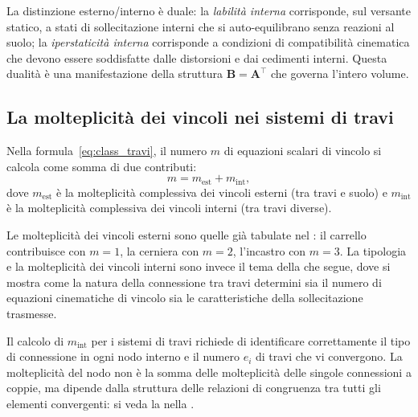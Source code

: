 \begin{oss}
	La distinzione esterno/interno è duale: la
	\emph{labilità interna} corrisponde, sul versante
	statico, a stati di sollecitazione interni che si
	auto-equilibrano senza reazioni al suolo; la
	\emph{iperstaticità interna} corrisponde a condizioni
	di compatibilità cinematica che devono essere soddisfatte
	dalle distorsioni e dai cedimenti interni. Questa
	dualità è una manifestazione della struttura
	$\bm{B} = \bm{A}^{\top}$ che governa l'intero volume.
\end{oss}

\subsection{La molteplicità dei vincoli nei sistemi di travi}
\label{subsec:molt_travi}

Nella formula~\eqref{eq:class_travi}, il numero $m$ di
equazioni scalari di vincolo si calcola come somma
di due contributi:
\begin{equation}\label{eq:m_travi}
	m = m_{\text{est}} + m_{\text{int}},
\end{equation}
dove $m_{\text{est}}$ è la molteplicità complessiva dei
vincoli esterni (tra travi e suolo) e $m_{\text{int}}$ è la
molteplicità complessiva dei vincoli interni (tra travi
diverse).

Le molteplicità dei vincoli esterni sono quelle già
tabulate nel : il carrello contribuisce
con $m = 1$, la cerniera con $m = 2$, l'incastro con
$m = 3$. La tipologia e la molteplicità dei vincoli interni
sono invece il tema della  che segue,
dove si mostra come la natura della connessione tra travi
determini sia il numero di equazioni cinematiche di vincolo
sia le caratteristiche della sollecitazione trasmesse.

\begin{oss}
	Il calcolo di $m_{\text{int}}$ per i sistemi di travi
	richiede di identificare correttamente il tipo di
	connessione in ogni nodo interno e il numero $e_i$
	di travi che vi convergono. La molteplicità del nodo
	non è la somma delle molteplicità delle singole
	connessioni a coppie, ma dipende dalla struttura
	delle relazioni di congruenza tra tutti gli elementi
	convergenti: si veda la  nella
	.
\end{oss}


